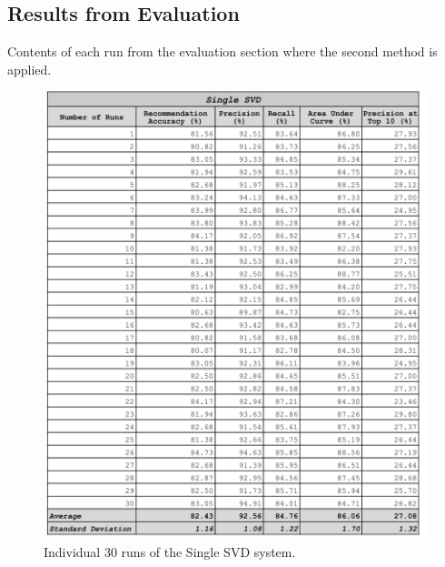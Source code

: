 \begin{appendices}

\chapter{Results from Evaluation} \label{appendix:results_table}
Contents of each run from the evaluation section where the second method is applied. 

\begin{figure}
\centering
\includegraphics[scale=0.3]{appendices/single_als_30_runs.png}
\caption{Individual 30 runs of the Single SVD system.}
\label{fig:single_algorithm}
\end{figure}


\end{appendices}
